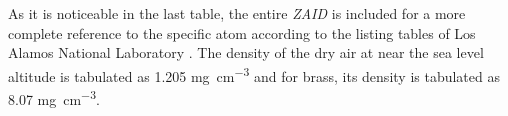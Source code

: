 As it is noticeable in the last table, the entire \emph{ZAID} is included for a more complete reference to the specific atom according to the listing tables of Los Alamos National Laboratory \cite{ACEDataTables}. The density of the dry air at near the sea level altitude is tabulated as 1.205 \unit{\milli\gram\per\cubic\centi\meter} and for brass, its density is tabulated as 8.07 \unit{\milli\gram\per\cubic\centi\meter}.


